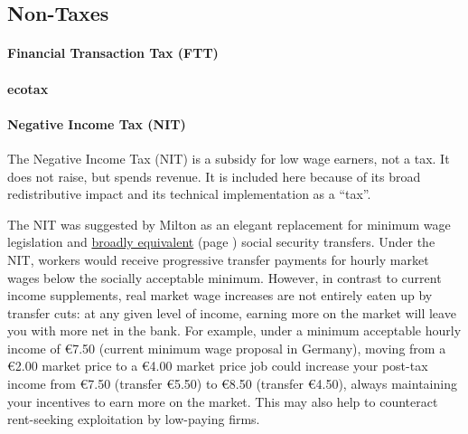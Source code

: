 

\subsection{Non-Taxes}

\paragraph{Financial Transaction Tax (FTT)}
	\label{sec:FTT}

\paragraph{ecotax}
	\label{sec:Ecotax}

\paragraph{Negative Income Tax (NIT)}
	\label{sec:NIT}
The Negative Income Tax (NIT) is a subsidy for low wage earners, not a tax.
It does not raise, but spends revenue.
It is included here because of its broad redistributive impact and its technical implementation as a ``tax''.

The NIT was suggested by Milton \cite{Friedman1962} as an elegant replacement for minimum wage legislation and \hyperref[sec:StructuralUnemployment]{broadly equivalent} (page \pageref{sec:StructuralUnemployment}) social security transfers.
Under the NIT, workers would receive progressive transfer payments for hourly market wages below the socially acceptable minimum.
However, in contrast to current income supplements, real market wage increases are not entirely eaten up by transfer cuts:
at any given level of income, earning more on the market will leave you with more net in the bank.
For example, under a minimum acceptable hourly income of \euro{}7.50 (current minimum wage proposal in Germany), moving from a \euro{}2.00 market price to a \euro{}4.00 market price job could increase your post-tax income from \euro{}7.50 (transfer \euro{}5.50) to \euro{}8.50 (transfer \euro{}4.50), always maintaining your incentives to earn more on the market.
This may also help to counteract rent-seeking exploitation by low-paying firms.

